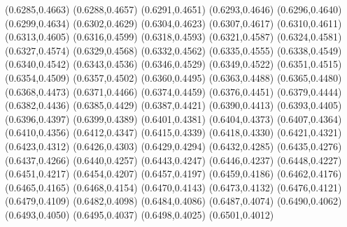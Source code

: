 \PST@Filltriangle(0.6285,0.4663)
\PST@Filltriangle(0.6288,0.4657)
\PST@Filltriangle(0.6291,0.4651)
\PST@Filltriangle(0.6293,0.4646)
\PST@Filltriangle(0.6296,0.4640)
\PST@Filltriangle(0.6299,0.4634)
\PST@Filltriangle(0.6302,0.4629)
\PST@Filltriangle(0.6304,0.4623)
\PST@Filltriangle(0.6307,0.4617)
\PST@Filltriangle(0.6310,0.4611)
\PST@Filltriangle(0.6313,0.4605)
\PST@Filltriangle(0.6316,0.4599)
\PST@Filltriangle(0.6318,0.4593)
\PST@Filltriangle(0.6321,0.4587)
\PST@Filltriangle(0.6324,0.4581)
\PST@Filltriangle(0.6327,0.4574)
\PST@Filltriangle(0.6329,0.4568)
\PST@Filltriangle(0.6332,0.4562)
\PST@Filltriangle(0.6335,0.4555)
\PST@Filltriangle(0.6338,0.4549)
\PST@Filltriangle(0.6340,0.4542)
\PST@Filltriangle(0.6343,0.4536)
\PST@Filltriangle(0.6346,0.4529)
\PST@Filltriangle(0.6349,0.4522)
\PST@Filltriangle(0.6351,0.4515)
\PST@Filltriangle(0.6354,0.4509)
\PST@Filltriangle(0.6357,0.4502)
\PST@Filltriangle(0.6360,0.4495)
\PST@Filltriangle(0.6363,0.4488)
\PST@Filltriangle(0.6365,0.4480)
\PST@Filltriangle(0.6368,0.4473)
\PST@Filltriangle(0.6371,0.4466)
\PST@Filltriangle(0.6374,0.4459)
\PST@Filltriangle(0.6376,0.4451)
\PST@Filltriangle(0.6379,0.4444)
\PST@Filltriangle(0.6382,0.4436)
\PST@Filltriangle(0.6385,0.4429)
\PST@Filltriangle(0.6387,0.4421)
\PST@Filltriangle(0.6390,0.4413)
\PST@Filltriangle(0.6393,0.4405)
\PST@Filltriangle(0.6396,0.4397)
\PST@Filltriangle(0.6399,0.4389)
\PST@Filltriangle(0.6401,0.4381)
\PST@Filltriangle(0.6404,0.4373)
\PST@Filltriangle(0.6407,0.4364)
\PST@Filltriangle(0.6410,0.4356)
\PST@Filltriangle(0.6412,0.4347)
\PST@Filltriangle(0.6415,0.4339)
\PST@Filltriangle(0.6418,0.4330)
\PST@Filltriangle(0.6421,0.4321)
\PST@Filltriangle(0.6423,0.4312)
\PST@Filltriangle(0.6426,0.4303)
\PST@Filltriangle(0.6429,0.4294)
\PST@Filltriangle(0.6432,0.4285)
\PST@Filltriangle(0.6435,0.4276)
\PST@Filltriangle(0.6437,0.4266)
\PST@Filltriangle(0.6440,0.4257)
\PST@Filltriangle(0.6443,0.4247)
\PST@Filltriangle(0.6446,0.4237)
\PST@Filltriangle(0.6448,0.4227)
\PST@Filltriangle(0.6451,0.4217)
\PST@Filltriangle(0.6454,0.4207)
\PST@Filltriangle(0.6457,0.4197)
\PST@Filltriangle(0.6459,0.4186)
\PST@Filltriangle(0.6462,0.4176)
\PST@Filltriangle(0.6465,0.4165)
\PST@Filltriangle(0.6468,0.4154)
\PST@Filltriangle(0.6470,0.4143)
\PST@Filltriangle(0.6473,0.4132)
\PST@Filltriangle(0.6476,0.4121)
\PST@Filltriangle(0.6479,0.4109)
\PST@Filltriangle(0.6482,0.4098)
\PST@Filltriangle(0.6484,0.4086)
\PST@Filltriangle(0.6487,0.4074)
\PST@Filltriangle(0.6490,0.4062)
\PST@Filltriangle(0.6493,0.4050)
\PST@Filltriangle(0.6495,0.4037)
\PST@Filltriangle(0.6498,0.4025)
\PST@Filltriangle(0.6501,0.4012)
